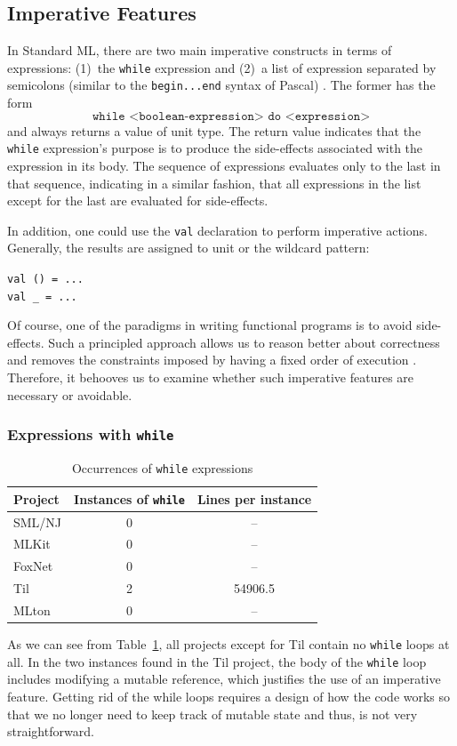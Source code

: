 \documentclass[12pt,abstracton]{scrartcl}
\begin{document}
\subsection{Imperative Features}\label{subsec:imper}
In Standard ML, there are two main imperative constructs in terms of expressions:
(1)~the \texttt{while} expression and (2)~a list of expression separated by semicolons (similar to the \texttt{begin...end} syntax of Pascal) \cite{Ull98}.
The former has the form
\[\texttt{while <boolean-expression> do <expression>}\] and always returns a value of unit type.
The return value indicates that the \texttt{while} expression's purpose is to produce the side-effects associated
with the expression in its body. The sequence of expressions evaluates only to the last in that sequence, indicating
in a similar fashion, that all expressions in the list except for the last are evaluated for side-effects.

In addition, one could use the \texttt{val} declaration to perform imperative actions.
Generally, the results are assigned to unit or the wildcard pattern:
\begin{center}
\texttt{val () = ...}\\
\texttt{val \_ = ...}
\end{center}
Of course, one of the paradigms in writing functional programs is to avoid side-effects.
Such a principled approach allows us to reason better about correctness and
removes the constraints imposed by having a fixed order of execution \cite{Hug90}. Therefore,
it behooves us to examine whether such imperative features are necessary or avoidable.
\subsubsection{Expressions with \texttt{while}}
\begin{table}[h!]
\centering
\begin{tabular}{|l||c|c|}
\hline
Project & Instances of \texttt{while} & Lines per instance \\ \hline\hline
SML/NJ & 0 & --\\
MLKit & 0 & --\\
FoxNet & 0 & -- \\
Til & 2 & 54906.5 \\
MLton & 0 & --\\ \hline
\end{tabular}
\caption{Occurrences of \texttt{while} expressions}
\label{table:while}
\end{table}
As we can see from Table~\ref{table:while}, all projects except for Til
contain no \texttt{while} loops at all.
In the two instances found in the Til project, the body of the \texttt{while}
loop includes modifying a mutable reference, which justifies the use of
an imperative feature. Getting rid of the while loops requires a design of how the code works so
that we no longer need to keep track of mutable state and thus, is not very straightforward.
\end{document}
